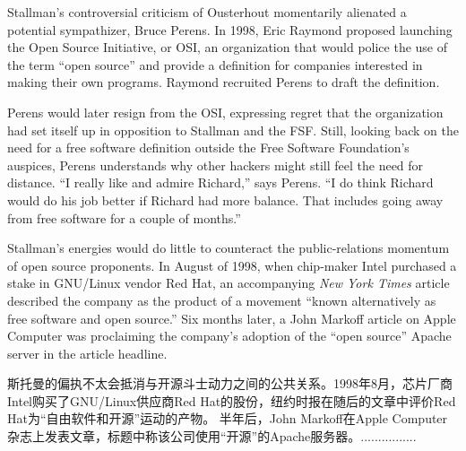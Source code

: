 \ifdefined\chs

\fi

\ifdefined\eng
Stallman's controversial criticism of Ousterhout momentarily alienated a potential sympathizer, Bruce Perens. In 1998, Eric Raymond proposed launching the Open Source Initiative, or OSI, an organization that would police the use of the term ``open source'' and provide a definition for companies interested in making their own programs. Raymond recruited Perens to draft the definition.
\fi

\ifdefined\chs

\fi

\ifdefined\eng
Perens would later resign from the OSI, expressing regret that the organization had set itself up in opposition to Stallman and the FSF. Still, looking back on the need for a free software definition outside the Free Software Foundation's auspices, Perens understands why other hackers might still feel the need for distance. ``I really like and admire Richard,'' says Perens. ``I do think Richard would do his job better if Richard had more balance. That includes going away from free software for a couple of months.''
\fi

\ifdefined\chs

\fi

\ifdefined\eng
Stallman's energies would do little to counteract the public-relations momentum of open source proponents. In August of 1998, when chip-maker Intel purchased a stake in GNU/Linux vendor Red Hat, an accompanying \textit{New York Times} article described the company as the product of a movement ``known alternatively as free software and open source.'' Six months later, a John Markoff article on Apple Computer was proclaiming the company's adoption of the ``open source'' Apache server in the article headline.
\fi

\ifdefined\chs
斯托曼的偏执不太会抵消与开源斗士动力之间的公共关系。1998年8月，芯片厂商Intel购买了GNU/Linux供应商Red Hat的股份，纽约时报在随后的文章中评价Red Hat为“自由软件和开源”运动的产物。 半年后，John Markoff在Apple Computer杂志上发表文章，标题中称该公司使用“开源”的Apache服务器。................
\fi

